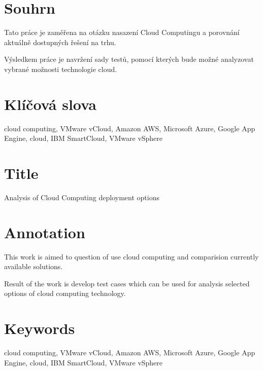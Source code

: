 
\section*{Souhrn}
Tato práce je zaměřena na otázku nasazení Cloud Computingu a porovnání aktuálně dostupných řešení na trhu.

Výsledkem práce je navržení sady testů, pomocí kterých bude možné analyzovat vybrané možnosti technologie cloud.

\section*{Klíčová slova}
cloud computing, VMware vCloud, Amazon AWS, Microsoft Azure, Google App Engine, cloud, IBM SmartCloud, VMware vSphere

\section*{Title}
Analysis of Cloud Computing deployment options

\section*{Annotation}
This work is aimed to question of use cloud computing and comparision currently available solutions.

Result of the work is develop test cases which can be used for analysis selected options of cloud computing technology.

\section*{Keywords}
cloud computing, VMware vCloud, Amazon AWS, Microsoft Azure, Google App Engine, cloud, IBM SmartCloud, VMware vSphere